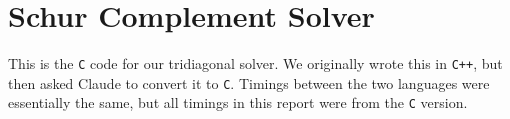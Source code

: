 \documentclass[11pt]{article}
\begin{document}
\clearpage
\appendix
\section{Schur Complement Solver}
This is the \texttt{C} code for our tridiagonal solver. We originally wrote this in \texttt{C++}, but then asked Claude to convert it to \texttt{C}. Timings between the two languages were essentially the same, but all timings in this report were from the \texttt{C} version.

\end{document}
